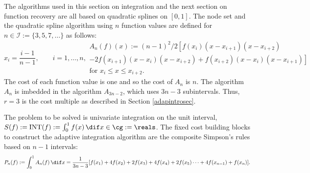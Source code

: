 \newpage
The algorithms used in this section on integration and the next section on function recovery are all based on quadratic splines on $[0,1]$.  The node set and the quadratic spline algorithm using $n$ function values are defined for $n \in \mathcal{I}:=\{3,5,7, \ldots\}$ as follows:
\begin{subequations} \label{linearspline}
\begin{equation}
x_i=\frac{i-1}{n-1}, \qquad i=1, \ldots, n,
\end{equation}
\begin{multline}
A_{n}(f)(x):=(n-1)^2/2 \left[ f(x_{i})(x-x_{i+1})(x-x_{i+2})\right. \\\left.- 2f(x_{i+1})(x-x_{i})(x-x_{i+2}) +f(x_{i+2})(x-x_i)(x-x_{i+1}) \right] \\ \text{for }x_i \leq x \leq x_{i+2}.
\end{multline}
\end{subequations}
The cost of each function value is one and so the cost of  $A_n$ is $n$. The algorithm $A_n$ is imbedded in the algorithm $A_{3n-2}$, which uses $3n-3$ subintervals.  Thus, $r=3$ is the cost multiple as described in Section \ref{adapintrosec}.

The problem to be solved is univariate integration on the unit interval, $S(f):=\INT(f):=\int_{0}^{1}f(x) \, \dif x \in \cg := \reals$.  The fixed cost building blocks to construct the adaptive integration algorithm are the composite Simpson's rules based on $n-1$ intervals:
\begin{equation*}
    P_{n}(f) := \int_0^1 A_n(f) \, \dif x
    =\frac{1}{3n-3}[f(x_1)+4f(x_2)+2f(x_3)+4f(x_4)+2f(x_5)\cdots+4f(x_{n-1})+f(x_n)].
\end{equation*}

